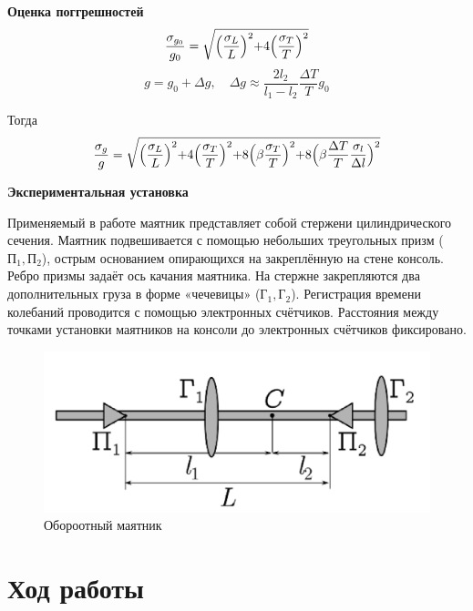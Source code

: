\documentclass[a4paper,12 pt]{article}
\begin{document}
\textbf{Оценка поггрешностей}
\begin{displaymath}
    \frac{\sigma_{g_0}}{g_0} = \sqrt{\Bigr(\frac{\sigma_L}{L} \Bigl) ^2 + 4 \Bigr(\frac{\sigma_T}{T} \Bigl) ^2}
\end{displaymath}
\begin{displaymath}
    g=g_0 + \Delta g, \quad \Delta g \approx \frac{2l_2}{l_1-l_2} \frac{\Delta T}{T} g_0
\end{displaymath}

Тогда 
\begin{displaymath}
    \frac{\sigma_{g}}{g} = \sqrt{\Bigr(\frac{\sigma_L}{L} \Bigl) ^2 + 4 \Bigr(\frac{\sigma_T}{T} \Bigl) ^2 + 8 \Bigr(\beta \frac{\sigma_T}{T} \Bigl) ^2 + 8 \Bigr(\beta \frac{\Delta T}{T} \frac{\sigma_l}{\Delta l} \Bigl) ^2}
\end{displaymath}

\textbf{Экспериментальная установка}

Применяемый в работе маятник представляет собой стержени цилиндрического сечения. Маятник подвешивается с помощью небольших треугольных призм ($ \text{П}_1, \text{П}_2$), острым основанием опирающихся на закреплённую на стене консоль. Ребро призмы задаёт ось качания маятника. На стержне закрепляются два дополнительных груза в форме «чечевицы» ($\text{Г}_1, \text{Г}_2$). Регистрация времени колебаний проводится с помощью электронных
счётчиков. Расстояния между точками установки маятников на консоли до
электронных счётчиков фиксировано.
\begin{figure}[H]
    \centering
    \includegraphics[scale=0.3]{маятник.png}
    \caption{Обороотный маятник}
\end{figure}



\section{Ход работы}
\end{document}
